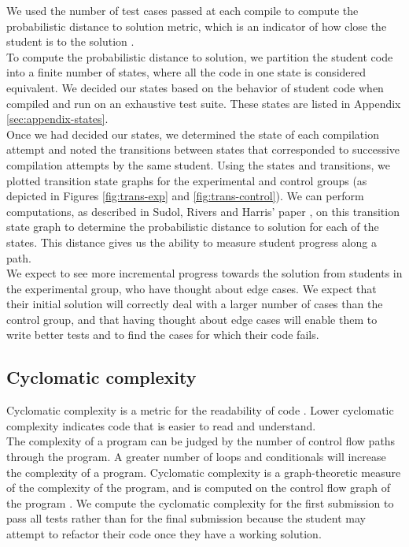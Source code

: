 \documentclass[11pt,letterpaper]{article}
\begin{document}
We used the number of test cases passed at each compile to compute the probabilistic distance to solution metric, which is an indicator of how close the student is to the solution \cite{SudolRiversHarris12}.\\

To compute the probabilistic distance to solution, we partition the student code into a finite number of states, where all the code in one state is considered equivalent. We decided our states based on the behavior of student code when compiled and run on an exhaustive test suite. These states are listed in Appendix \ref{sec:appendix-states}.\\

Once we had decided our states, we determined the state of each compilation attempt and noted the transitions between states that corresponded to successive compilation attempts by the same student. Using the states and transitions, we plotted transition state graphs for the experimental and control groups (as depicted in Figures \ref{fig:trans-exp} and \ref{fig:trans-control}). We can perform computations, as described in Sudol, Rivers and Harris' paper \cite{SudolRiversHarris12}, on this transition state graph to determine the probabilistic distance to solution for each of the states. This distance gives us the ability to measure student progress along a path.\\

We expect to see more incremental progress towards the solution from students in the experimental group, who have thought about edge cases. We expect that their initial solution will correctly deal with a larger number of cases than the control group, and that having thought about edge cases will enable them to write better tests and to find the cases for which their code fails.


\subsection{Cyclomatic complexity}

Cyclomatic complexity is a metric for the readability of code \cite{McCabe76}. Lower cyclomatic complexity indicates code that is easier to read and understand.\\

The complexity of a program can be judged by the number of control flow paths through the program. A greater number of loops and conditionals will increase the complexity of a program. Cyclomatic complexity is a graph-theoretic measure of the complexity of the program, and is computed on the control flow graph of the program \cite{McCabe76}. We compute the cyclomatic complexity for the first submission to pass all tests rather than for the final submission because the student may attempt to refactor their code once they have a working solution.\\
\end{document}
